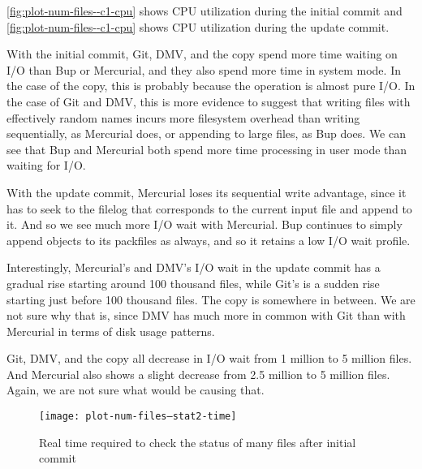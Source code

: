 \autoref{fig:plot-num-files--c1-cpu} shows CPU utilization during the initial
\gls{commit} and \autoref{fig:plot-num-files--c1-cpu} shows CPU utilization
during the update \gls{commit}.

With the initial commit, Git, DMV, and the copy spend more time waiting on I/O
than Bup or Mercurial, and they also spend more time in system mode. In the case
of the copy, this is probably because the operation is almost pure I/O. In the
case of Git and \gls{DMV}, this is more evidence to suggest that writing files
with effectively random names incurs more filesystem overhead than writing
sequentially, as Mercurial does, or appending to large files, as Bup does. We
can see that Bup and Mercurial both spend more time processing in user mode than
waiting for I/O.

With the update commit, Mercurial loses its sequential write advantage, since it
has to seek to the \gls{filelog} that corresponds to the current input file and
append to it. And so we see much more I/O wait with Mercurial. Bup continues to
simply append objects to its \glspl{packfile} as always, and so it retains a low
I/O wait profile.

Interestingly, Mercurial's and \gls{DMV}'s I/O wait in the update commit has a
gradual rise starting around 100 thousand files, while Git's is a sudden rise
starting just before 100 thousand files. The copy is somewhere in between. We
are not sure why that is, since \gls{DMV} has much more in common with Git than
with Mercurial in terms of disk usage patterns.

Git, \gls{DMV}, and the copy all decrease in I/O wait from \num{1} million to
\num{5} million files. And Mercurial also shows a slight decrease from \num{2.5}
million to \num{5} million files. Again, we are not sure what would be causing
that.

%


\begin{figure}[p]
    \begin{leftfullpage}
        \caption{Real time required to check the status of many files after
        initial commit}
        \label{fig:plot-num-files--stat2-time}
        \centering

        \explainlogsubfig

        \texttt{[image: plot-num-files--stat2-time]}
    \end{leftfullpage}
\end{figure}

\cleardoublepage

